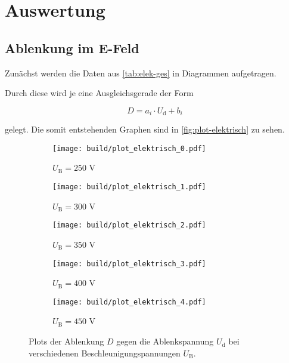 \section{Auswertung}
\label{sec:Auswertung}

\subsection{Ablenkung im E-Feld}

Zunächst werden die Daten aus \autoref{tab:elek-ges} in Diagrammen aufgetragen.



Durch diese wird je eine Ausgleichsgerade der Form 

\begin{equation}
  D = a_i \cdot U_\text{d} + b_i
\end{equation}

gelegt. Die somit entstehenden Graphen sind in \autoref{fig:plot-elektrisch} zu sehen.

\begin{figure}
  \centering
  \begin{subfigure}{0.49\textwidth}
    \centering
    \texttt{[image: build/plot\_elektrisch\_0.pdf]}
    \caption{$U_\text{B} = 250$ V}
  \end{subfigure}
  \begin{subfigure}{0.49\textwidth}
    \centering
    \texttt{[image: build/plot\_elektrisch\_1.pdf]}
    \caption{$U_\text{B} = 300$ V}
  \end{subfigure}

  \begin{subfigure}{0.49\textwidth}
    \centering
    \texttt{[image: build/plot\_elektrisch\_2.pdf]}
    \caption{$U_\text{B} = 350$ V}
  \end{subfigure}
  \begin{subfigure}{0.49\textwidth}
    \centering
    \texttt{[image: build/plot\_elektrisch\_3.pdf]}
    \caption{$U_\text{B} = 400$ V}
  \end{subfigure}

  \begin{subfigure}{0.49\textwidth}
    \centering
    \texttt{[image: build/plot\_elektrisch\_4.pdf]}
    \caption{$U_\text{B} = 450$ V}
  \end{subfigure}
  \caption{Plots der Ablenkung $D$ gegen die Ablenkspannung $U_\text{d}$ bei verschiedenen Beschleunigungspannungen $U_\text{B}$.}
  \label{fig:plot-elektrisch}
\end{figure}

